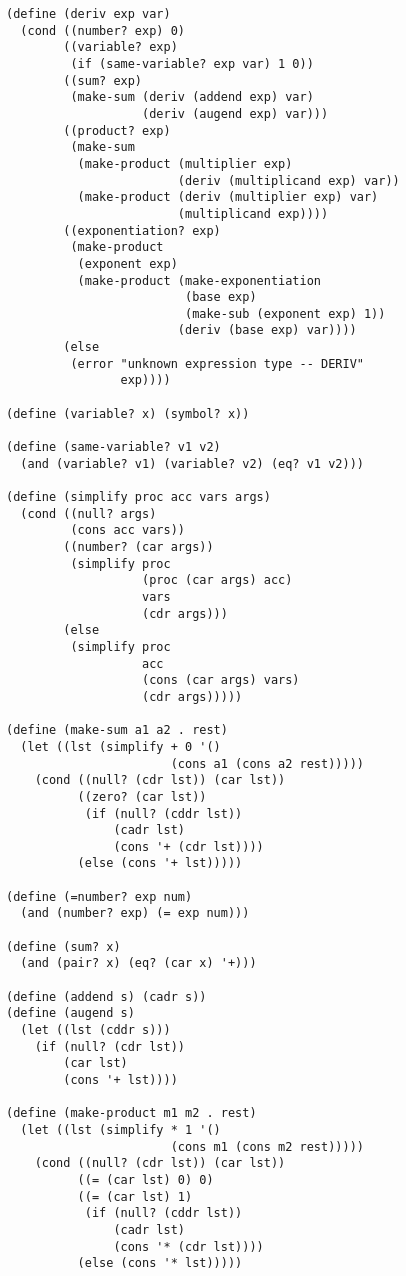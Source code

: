 \documentclass[a4paper,12pt]{article}
\begin{document}
\begin{lstlisting}
(define (deriv exp var)
  (cond ((number? exp) 0)
        ((variable? exp)
         (if (same-variable? exp var) 1 0))
        ((sum? exp)
         (make-sum (deriv (addend exp) var)
                   (deriv (augend exp) var)))
        ((product? exp)
         (make-sum
          (make-product (multiplier exp)
                        (deriv (multiplicand exp) var))
          (make-product (deriv (multiplier exp) var)
                        (multiplicand exp))))
        ((exponentiation? exp)
         (make-product
          (exponent exp)
          (make-product (make-exponentiation
                         (base exp)
                         (make-sub (exponent exp) 1))
                        (deriv (base exp) var))))
        (else
         (error "unknown expression type -- DERIV"
                exp))))

(define (variable? x) (symbol? x))

(define (same-variable? v1 v2)
  (and (variable? v1) (variable? v2) (eq? v1 v2)))

(define (simplify proc acc vars args)
  (cond ((null? args)
         (cons acc vars))
        ((number? (car args))
         (simplify proc
                   (proc (car args) acc)
                   vars
                   (cdr args)))
        (else
         (simplify proc
                   acc
                   (cons (car args) vars)
                   (cdr args)))))

(define (make-sum a1 a2 . rest)
  (let ((lst (simplify + 0 '()
                       (cons a1 (cons a2 rest)))))
    (cond ((null? (cdr lst)) (car lst))
          ((zero? (car lst))
           (if (null? (cddr lst))
               (cadr lst)
               (cons '+ (cdr lst))))
          (else (cons '+ lst)))))

(define (=number? exp num)
  (and (number? exp) (= exp num)))

(define (sum? x)
  (and (pair? x) (eq? (car x) '+)))

(define (addend s) (cadr s))
(define (augend s)
  (let ((lst (cddr s)))
    (if (null? (cdr lst))
        (car lst)
        (cons '+ lst))))

(define (make-product m1 m2 . rest)
  (let ((lst (simplify * 1 '()
                       (cons m1 (cons m2 rest)))))
    (cond ((null? (cdr lst)) (car lst))
          ((= (car lst) 0) 0)
          ((= (car lst) 1)
           (if (null? (cddr lst))
               (cadr lst)
               (cons '* (cdr lst))))
          (else (cons '* lst)))))


\end{lstlisting}
\end{document}
